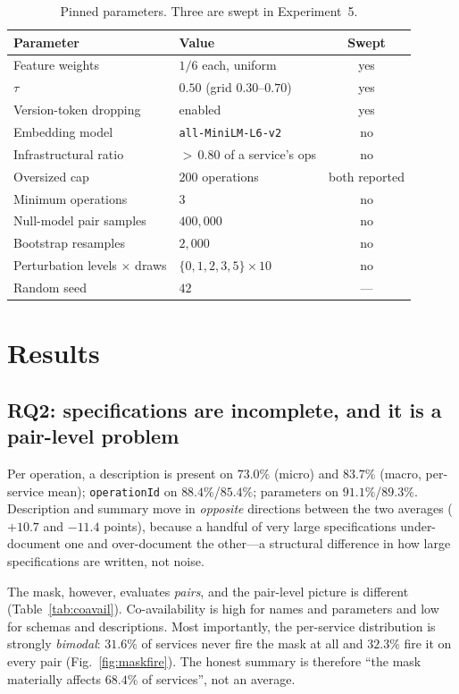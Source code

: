 \documentclass[journal]{IEEEtran}
\newcommand{\code}[1]{\texttt{\small #1}}
\begin{document}
\begin{table}[!t]
\caption{Pinned parameters. Three are swept in Experiment~5.}
\label{tab:params}
\centering
\footnotesize
\begin{tabular}{@{}llc@{}}
\toprule
\textbf{Parameter} & \textbf{Value} & \textbf{Swept} \\
\midrule
Feature weights & $1/6$ each, uniform & yes \\
$\tau$ & $0.50$ (grid $0.30$--$0.70$) & yes \\
Version-token dropping & enabled & yes \\
Embedding model & \code{all-MiniLM-L6-v2} & no \\
Infrastructural ratio & ${>}\,0.80$ of a service's ops & no \\
Oversized cap & $200$ operations & both reported \\
Minimum operations & $3$ & no \\
Null-model pair samples & $400{,}000$ & no \\
Bootstrap resamples & $2{,}000$ & no \\
Perturbation levels $\times$ draws & $\{0,1,2,3,5\} \times 10$ & no \\
Random seed & $42$ & --- \\
\bottomrule
\end{tabular}
\end{table}

\section{Results}
\label{sec:results}

\subsection{RQ2: specifications are incomplete, and it is a pair-level problem}
\label{sec:res-avail}
Per operation, a description is present on $73.0\%$ (micro) and $83.7\%$ (macro,
per-service mean); \code{operationId} on $88.4\%$/$85.4\%$; parameters on
$91.1\%$/$89.3\%$. Description and summary move in \emph{opposite} directions
between the two averages ($+10.7$ and $-11.4$ points), because a handful of very
large specifications under-document one and over-document the other---a
structural difference in how large specifications are written, not noise.

The mask, however, evaluates \emph{pairs}, and the pair-level picture is
different (Table~\ref{tab:coavail}). Co-availability is high for names and
parameters and low for schemas and descriptions. Most importantly, the
per-service distribution is strongly \emph{bimodal}: $31.6\%$ of services never
fire the mask at all and $32.3\%$ fire it on every pair
(Fig.~\ref{fig:maskfire}). The honest summary is therefore ``the mask materially
affects $68.4\%$ of services'', not an average.
\end{document}
